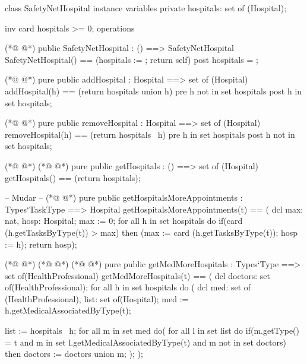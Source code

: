 \begin{vdmpp}[breaklines=true]
class SafetyNetHospital
instance variables
 private hospitals: set of (Hospital);
 
 inv card hospitals >= 0;
operations

(*@
\label{SafetyNetHospital:8}
@*)
 public SafetyNetHospital : () ==> SafetyNetHospital
  SafetyNetHospital() == (hospitals := {}; return self)
 post hospitals = {};
  
(*@
\label{addHospital:12}
@*)
 pure public addHospital : Hospital ==> set of (Hospital)
  addHospital(h) == (return hospitals union {h})
 pre h not in set hospitals
 post h in set hospitals;
 
(*@
\label{removeHospital:17}
@*)
 pure public removeHospital : Hospital ==> set of (Hospital)
  removeHospital(h) == (return hospitals \ {h})
 pre h in set hospitals
 post h not in set hospitals;
 
(*@
\label{getHospitals:22}
@*)
(*@
\label{numHospitals:22}
@*)
 pure public getHospitals : () ==> set of (Hospital)
  getHospitals() == (return hospitals);
 
 -- Mudar -- 
(*@
\label{getHospitalsMoreAppointments:26}
@*)
 pure public getHospitalsMoreAppointments : Types`TaskType ==> Hospital
  getHospitalsMoreAppointments(t) == (
                    dcl max: nat, hosp: Hospital;
                    max := 0;
                    for all h in set hospitals do
                     if(card (h.getTasksByType(t)) > max)
                      then (max := card (h.getTasksByType(t)); hosp := h);
                    return hosp);
 
(*@
\label{getDoctorsMoreHospitals:35}
@*)
(*@
\label{getMedMoreHospitals:35}
@*)
(*@
\label{getMoreHospitals:35}
@*)
 pure public getMedMoreHospitals : Types`Type ==> set of(HealthProfessional)
  getMedMoreHospitals(t) == (
                  dcl doctors: set of(HealthProfessional);
                  for all h in set hospitals do (
                   dcl med: set of (HealthProfessional), list: set of(Hospital);
                   med := h.getMedicalAssociatedByType(t);
                   
                   list := hospitals \ {h};
                   for all m in set med do(
                    for all l in set list do
                     if(m.getType() = t and m in set l.getMedicalAssociatedByType(t) and m not in set doctors)
                      then doctors := doctors union {m};
                   );
                  );
                  

\end{vdmpp}
